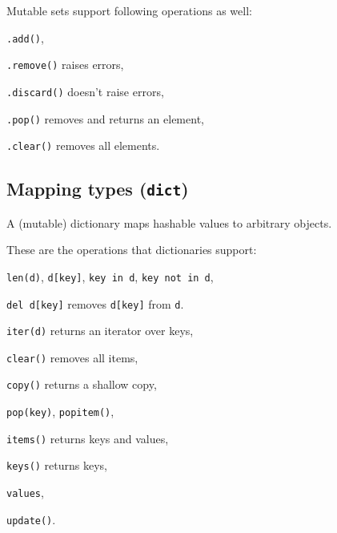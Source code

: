 Mutable sets support following operations as well:
\begin{compactenum}
	\item \texttt{.add()},
	\item \texttt{.remove()} raises errors,
	\item \texttt{.discard()} doesn't raise errors,
	\item \texttt{.pop()} removes and returns an element,
	\item \texttt{.clear()} removes all elements.
\end{compactenum}


\subsection{Mapping types (\texttt{dict})}
A (mutable) dictionary maps hashable values to arbitrary objects.

These are the operations that dictionaries support:
\begin{compactenum}
\item  \texttt{len(d)},
\texttt{d[key]},
\texttt{key in d},
\texttt{key not in d},
\item  \texttt{del d[key]} removes \texttt{d[key]} from \texttt{d}.
\item  \texttt{iter(d)} returns an iterator over keys,
\item  \texttt{clear()} removes all items,
\item  \texttt{copy()} returns a shallow copy,
\item \texttt{pop(key)}, \texttt{popitem()}, 
\item \texttt{items()} returns keys and values,
\item \texttt{keys()} returns keys,
\item \texttt{values}, 
\item \texttt{update()}.
\end{compactenum}




